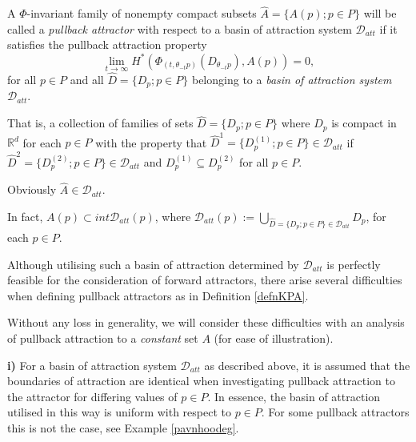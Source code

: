 \begin{defn}
\label{defnKPA}
A $\Phi$-invariant family of nonempty compact subsets $\hat{A} = \{A(p); p \in
P\}$  will be called a \textit{pullback attractor} with respect to a basin of
attraction system $\mathcal{D}_{att}$ if it satisfies the pullback attraction
property
\[ \lim_{t \to \infty} H^*(\Phi_{(t, \theta_{-t}p)}(D_{\theta_{-t}p}), A(p)) =
                                 0, \]
for all $p \in P$ and all $\hat{D} = \{ D_p ; p \in P \}$ belonging to a
\textit{basin of attraction system} $\mathcal{D}_{att}$.

That is, a collection of families of sets $\hat{D} = \{ D_p ; p \in P \}$ where
$D_p$ is compact in $\mathbb{R}^d$ for each $p \in P$ with the property that
$\hat{D}^1 = \{ D_p^{(1)} ; p \in P \} \in \mathcal{D}_{att}$ if $\hat{D}^2 = \{
D_p^{(2)} ; p \in P \} \in \mathcal{D}_{att}$ and $D_p^{(1)} \subseteq
D_p^{(2)}$ for all $p \in P$.

Obviously $\hat{A} \in \mathcal{D}_{att}$.

In fact, $A(p) \subset int \mathcal{D}_{att}(p)$, where $\mathcal{D}_{att}(p) :=
\bigcup_{\hat{D} = \{ D_p ; p \in P \} \in \mathcal{D}_{att}} D_p$, for each $p
\in P$.
\end{defn}

Although utilising such a basin of attraction determined by
$\mathcal{D}_{att}$ is perfectly feasible for the consideration of forward
attractors, there arise several difficulties when defining pullback attractors
as in Definition  \ref{defnKPA}.

Without any loss in generality, we will consider these difficulties
with an analysis of pullback attraction to a \textit{constant} set $A$ (for ease
of illustration).


\textbf{i)} For a basin of attraction system $\mathcal{D}_{att}$ as described
above, it is assumed that the boundaries of attraction are identical when
investigating pullback attraction to the attractor for differing values of $p
\in P$. In essence, the basin of attraction utilised in this way is uniform
with respect to $p \in P$. For some pullback attractors this is not the case,
see Example \ref{pavnhoodeg}.

